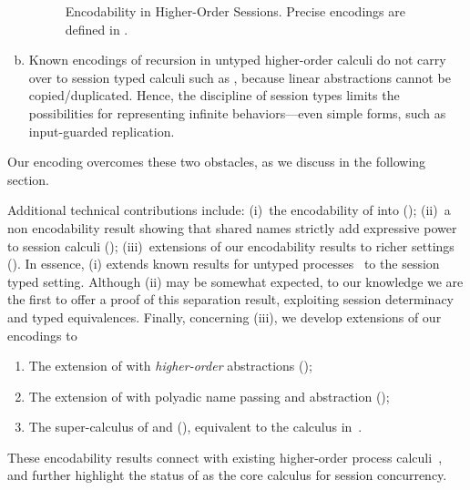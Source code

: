 \begin{enumerate}[a.]
\begin{figure}[t]
	\caption{Encodability in Higher-Order Sessions. 
	Precise encodings are defined in .
	\label{fig:express}}
\vspace{-5mm}
\Hlinefig
\end{figure}

\item %
Known encodings of recursion in untyped higher-order calculi
do not carry over to session typed calculi such as \HOp,
because linear abstractions cannot be copied/duplicated. Hence, the discipline of session types  limits 
the possibilities for representing infinite behaviors---even simple forms, such as input-guarded replication.
\end{enumerate}





\noi
Our encoding overcomes these two obstacles, as we discuss in the following section.

Additional technical contributions include: (i)~the encodability of \HO into \sessp (); (ii)~a non encodability result showing that shared names strictly add expressive power to session calculi ();
(iii)~extensions of our encodability results to richer settings (). 
In essence, (i) extends known  results for untyped processes~\cite{SangiorgiD:expmpa} to the session typed setting.
Although (ii) may be somewhat expected, to our knowledge we are the first to offer a proof of this separation result, 
exploiting session determinacy and typed equivalences.
Finally, concerning (iii), we develop extensions of our encodings to 
\begin{enumerate}[-]
\item The extension of \HOp with \emph{higher-order} abstractions (\HOpp); 
\item The extension of \HOp with polyadic name passing and abstraction (\pHOp); 
\item The super-calculus of \HOpp and \pHOp (\PHOpp), equivalent to the calculus in~\cite{tlca07}.
\end{enumerate}
These
encodability results connect \HOp with existing higher-order process calculi~\cite{tlca07}, and  
further highlight the status of \HO as the core calculus for session concurrency.




